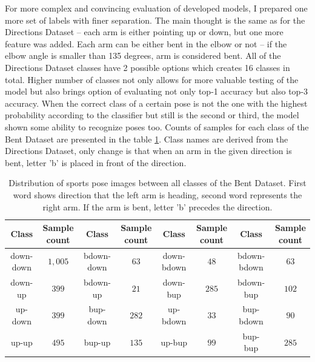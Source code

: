 For more complex and convincing evaluation of developed models, I prepared one more set of labels with finer separation. The main thought is the same as for the Directions Dataset -- each arm is either pointing up or down, but one more feature was added. Each arm can be either bent in the elbow or not -- if the elbow angle is smaller than 135 degrees, arm is considered bent. All of the Directions Dataset classes have 2 possible options which creates 16 classes in total. Higher number of classes not only allows for more valuable testing of the model but also brings option of evaluating not only top-1 accuracy but also top-3 accuracy. When the correct class of a certain pose is not the one with the highest probability according to the classifier but still is the second or third, the model shown some ability to recognize poses too. Counts of samples for each class of the Bent Dataset are presented in the table \ref{tab:bent-dataset-counts}. Class names are derived from the Directions Dataset, only change is that when an arm in the given direction is bent, letter 'b' is placed in front of the direction.

\begin{table}[!ht]
    \footnotesize
    \begin{center}
        \begin{tabular}{ |c|c||c|c||c|c||c|c| }
            \hline
                Class & \makecell{Sample \\ count} & Class & \makecell{Sample \\ count} & Class & \makecell{Sample \\ count} & Class & \makecell{Sample \\ count} \\
            \hline
            \hline
            down-down & $1,005$ & bdown-down & $63$ & down-bdown & $48$ & bdown-bdown & $63$ \\
            \hline
            down-up & $399$ & bdown-up & $21$ & down-bup & $285$ & bdown-bup & $102$ \\
            \hline
            up-down & $399$ & bup-down & $282$ & up-bdown & $33$ & bup-bdown & $90$ \\
            \hline
            up-up & $495$ & bup-up & $135$ & up-bup & $99$ & bup-bup & $285$ \\
            \hline
        \end{tabular}
    \end{center}
    \caption{Distribution of sports pose images between all classes of the Bent Dataset. First word shows direction that the left arm is heading, second word represents the right arm. If the arm is bent, letter 'b' precedes the direction.}
    \label{tab:bent-dataset-counts}
\end{table}


